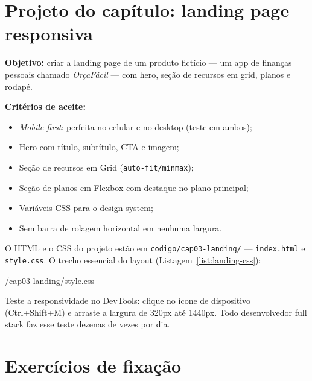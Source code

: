 \section{Projeto do capítulo: landing page responsiva}
\label{sec:projeto3}

\begin{caixaprojeto}
\textbf{Objetivo:} criar a landing page de um produto fictício — um app de
finanças pessoais chamado \emph{OrçaFácil} — com hero, seção de recursos em
grid, planos e rodapé.

\textbf{Critérios de aceite:}
\begin{itemize}[leftmargin=*, itemsep=0.2em]
  \item \emph{Mobile-first}: perfeita no celular e no desktop (teste em ambos);
  \item Hero com título, subtítulo, CTA e imagem;
  \item Seção de recursos em Grid (\texttt{auto-fit/minmax});
  \item Seção de planos em Flexbox com destaque no plano principal;
  \item Variáveis CSS para o design system;
  \item Sem barra de rolagem horizontal em nenhuma largura.
\end{itemize}
\end{caixaprojeto}

O HTML e o CSS do projeto estão em \texttt{codigo/cap03-landing/} —
\texttt{index.html} e \texttt{style.css}. O trecho essencial do layout
(Listagem~\ref{list:landing-css}):


  {\codigopath/cap03-landing/style.css}

\begin{caixadica}
Teste a responsividade no DevTools: clique no ícone de dispositivo (Ctrl+Shift+M)
e arraste a largura de 320px até 1440px. Todo desenvolvedor full stack faz esse
teste dezenas de vezes por dia.
\end{caixadica}

\section{Exercícios de fixação}

